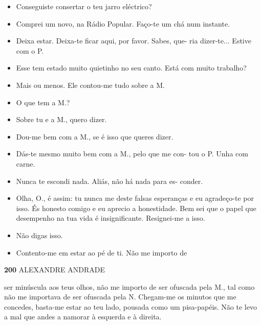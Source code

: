 \begin{itemize}
\tightlist
\item
  Conseguiste consertar o teu jarro eléctrico?
\item
  Comprei um novo, na Rádio Popular. Faço-te um chá num instante.
\item
  Deixa estar. Deixa-te ficar aqui, por favor. Sabes, que- ria
  dizer-te... Estive com o P.
\item
  Esse tem estado muito quietinho no seu canto. Está com muito trabalho?
\item
  Mais ou menos. Ele contou-me tudo sobre a M.
\item
  O que tem a M.?
\item
  Sobre tu e a M., quero dizer.
\item
  Dou-me bem com a M., se é isso que queres dizer.
\item
  Dás-te mesmo muito bem com a M., pelo que me con- tou o P. Unha com
  carne.
\item
  Nunca te escondi nada. Aliás, não há nada para es- conder.
\item
  Olha, O., é assim: tu nunca me deste falsas esperanças e eu
  agradeço-te por isso. És honesto comigo e eu aprecio a honestidade.
  Bem sei que o papel que desempenho na tua vida é insignificante.
  Resignei-me a isso.
\item
  Não digas isso.
\item
  Contento-me em estar ao pé de ti. Não me importo de
\end{itemize}

\textbf{200 }ALEXANDRE ANDRADE

ser minúscula aos teus olhos, não me importo de ser ofuscada pela M.,
tal como não me importava de ser ofuscada pela N. Chegam-me os minutos
que me concedes, basta-me estar ao teu lado, pousada como um
pisa-papéis. Não te levo a mal que andes a namorar à esquerda e à
direita.

